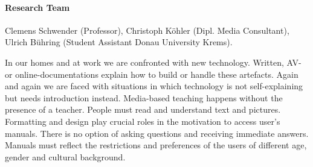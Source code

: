 
\paragraph{Research Team}
Clemens Schwender (Professor), Christoph K\"{o}hler (Dipl. Media Consultant), Ulrich B\"{u}hring (Student Assistant Donau University Krems).

 In our homes and at work we are confronted with new technology. Written, AV- or online-documentations explain how to build or handle these artefacts. Again and again we are faced with situations in which technology is not self-explaining but needs introduction instead. Media-based teaching happens without the presence of a teacher. People must read and understand text and pictures. Formatting and design play crucial roles in the motivation to access user's manuals. There is no option of asking questions and receiving immediate answers. Manuals must reflect the restrictions and preferences of the users of different age, gender and cultural background.

